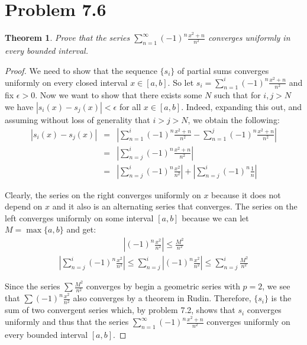 \documentclass[psamsfonts]{amsart}
\newtheorem{thm}{Theorem}[section]
\theoremstyle{definition}
\theoremstyle{remark}
\numberwithin{equation}{section}
\begin{document}
\section{Problem 7.6}

\begin{thm}
Prove that the series $\sum_{n=1}^\infty (-1)^n \frac{x^2 + n}{n^2}$ converges uniformly in every bounded interval.
\end{thm}

\begin{proof}
We need to show that the sequence $\{ s_i \}$ of partial sums converges uniformly on every closed interval $x \in [a,b]$. So let $s_i = \sum_{n=1}^i (-1)^n \frac{x^2 + n}{n^2}$ and fix $\epsilon > 0$. Now we want to show that there exists some $N$ such that for $i,j > N$ we have $|s_i(x) - s_j(x)| < \epsilon$ for all $x \in [a,b]$. Indeed, expanding this out, and assuming without loss of generality that $i > j > N$, we obtain the following:
\begin{eqnarray}
|s_i(x) - s_j(x) | &=& \left|\sum_{n=1}^i (-1)^n \frac{x^2 + n}{n^2} - \sum_{n=1}^j (-1)^n \frac{x^2 + n}{n^2} \right| \\
&=& \left| \sum_{n=j}^i (-1)^n \frac{x^2+n}{n^2} \right| \\
&=& \left| \sum_{n=j}^i (-1)^n \frac{x^2}{n^2} \right| + \left| \sum_{n=j}^i (-1)^n \frac{1}{n} \right|
\end{eqnarray}

Clearly, the series on the right converges uniformly on $x$ because it does not depend on $x$ and it also is an alternating series that converges.  The series on the left converges uniformly on some interval $[a,b]$ because we can let $M = \max \{a,b\}$ and get:
\begin{eqnarray}
\left|(-1)^n \frac{x^2}{n^2} \right| \leq \frac{M^2}{n^2}
\end{eqnarray}
\begin{eqnarray}
\left| \sum_{n=j}^i (-1)^n \frac{x^2}{n^2} \right| \leq \sum_{n=j}^i \left| (-1)^n \frac{x^2}{n^2} \right| \leq \sum_{n=j}^i \frac{M^2}{n^2} 
\end{eqnarray}

Since the series $\sum \frac{M^2}{n^2}$ converges by begin a geometric series with $p = 2$, we see that $\sum (-1)^n \frac{x^2}{n^2}$ also converges by a theorem in Rudin. Therefore, $\{ s_i \}$ is the sum of two convergent series which, by problem 7.2, shows that $s_i$ converges uniformly and thus that the series $\sum_{n=1}^\infty (-1)^n \frac{x^2+n}{n^2}$ converges uniformly on every bounded interval $[a,b]$. 
\end{proof}
\end{document}
